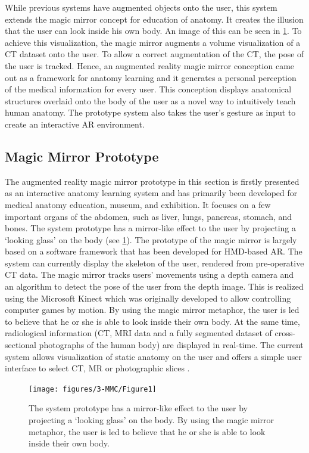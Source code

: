 While previous systems have augmented objects onto the user, this system extends the magic mirror concept for education of anatomy. It creates the illusion that the user can look inside his own body. An image of this can be seen in \figurename{\ref{fig:3-MMC:Prototype}}. To achieve this visualization, the magic mirror augments a volume visualization of a CT dataset onto the user. To allow a correct augmentation of the CT, the pose of the user is tracked. Hence, an augmented reality magic mirror conception came out as a framework for anatomy learning and it generates a personal perception of the medical information for every user. This conception displays anatomical structures overlaid onto the body of the user as a novel way to intuitively teach human anatomy. The prototype system also takes the user's gesture as input to create an interactive AR environment. 

\subsection{Magic Mirror Prototype}
The augmented reality magic mirror prototype in this section is firstly presented as an interactive anatomy learning system and has primarily been developed for medical anatomy education, museum, and exhibition. It focuses on a few important organs of the abdomen, such as liver, lungs, pancreas, stomach, and bones.  
The system prototype has a mirror-like effect to the user by projecting a `looking glass' on the body (see \figurename{\ref{fig:3-MMC:Prototype}}). The prototype of the magic mirror is largely based on a software framework that has been developed for HMD-based AR. The system can currently display the skeleton of the user, rendered from pre-operative CT data. The magic mirror tracks users' movements using a depth camera and an algorithm to detect the pose of the user from the depth image. This is realized using the Microsoft Kinect which was originally developed to allow controlling computer games by motion. By using the magic mirror metaphor, the user is led to believe that he or she is able to look inside their own body. At the same time, radiological information (CT, MRI data and a fully segmented dataset of cross-sectional photographs of the human body) are displayed in real-time. The current system allows visualization of static anatomy on the user and offers a simple user interface to select CT, MR or photographic slices \cite{Blum2012,Navab2012a}.
\begin{figure}
	\centering
	\texttt{[image: figures/3-MMC/Figure1]}
	\caption[The Magic Mirror]{The system prototype has a mirror-like effect to the user by projecting a `looking glass' on the body. By using the magic mirror metaphor, the user is led to believe that he or she is able to look inside their own body.}
	\label{fig:3-MMC:Prototype}
\end{figure}

